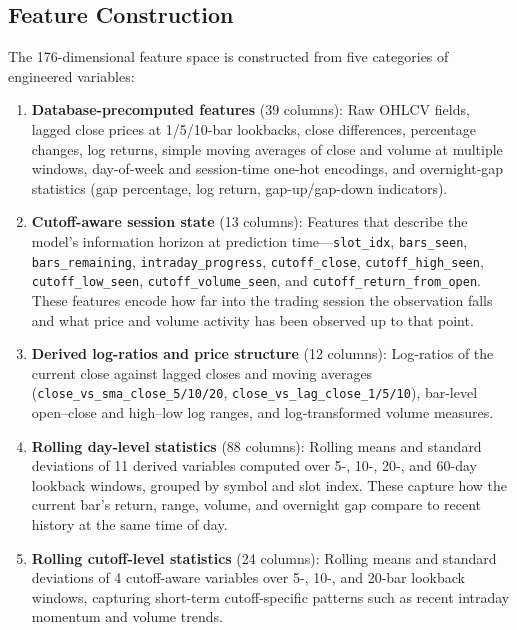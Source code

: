 \documentclass[conference]{IEEEtran}
\begin{document}
\subsection{Feature Construction}\label{sec:featureeng}
The 176-dimensional feature space is constructed from five categories of engineered variables:

\begin{enumerate}
    \item \textbf{Database-precomputed features} (39 columns): Raw OHLCV fields, lagged close prices at 1/5/10-bar lookbacks, close differences, percentage changes, log returns, simple moving averages of close and volume at multiple windows, day-of-week and session-time one-hot encodings, and overnight-gap statistics (gap percentage, log return, gap-up/gap-down indicators).

    \item \textbf{Cutoff-aware session state} (13 columns): Features that describe the model's information horizon at prediction time---\texttt{slot\_idx}, \texttt{bars\_seen}, \texttt{bars\_remaining}, \texttt{intraday\_progress}, \texttt{cutoff\_close}, \texttt{cutoff\_high\_seen}, \texttt{cutoff\_low\_seen}, \texttt{cutoff\_volume\_seen}, and \texttt{cutoff\_return\_from\_open}. These features encode how far into the trading session the observation falls and what price and volume activity has been observed up to that point.

    \item \textbf{Derived log-ratios and price structure} (12 columns): Log-ratios of the current close against lagged closes and moving averages (\texttt{close\_vs\_sma\_close\_5/10/20}, \texttt{close\_vs\_lag\_close\_1/5/10}), bar-level open--close and high--low log ranges, and log-transformed volume measures.

    \item \textbf{Rolling day-level statistics} (88 columns): Rolling means and standard deviations of 11 derived variables computed over 5-, 10-, 20-, and 60-day lookback windows, grouped by symbol and slot index. These capture how the current bar's return, range, volume, and overnight gap compare to recent history at the same time of day.

    \item \textbf{Rolling cutoff-level statistics} (24 columns): Rolling means and standard deviations of 4 cutoff-aware variables over 5-, 10-, and 20-bar lookback windows, capturing short-term cutoff-specific patterns such as recent intraday momentum and volume trends.
\end{enumerate}
\end{document}
